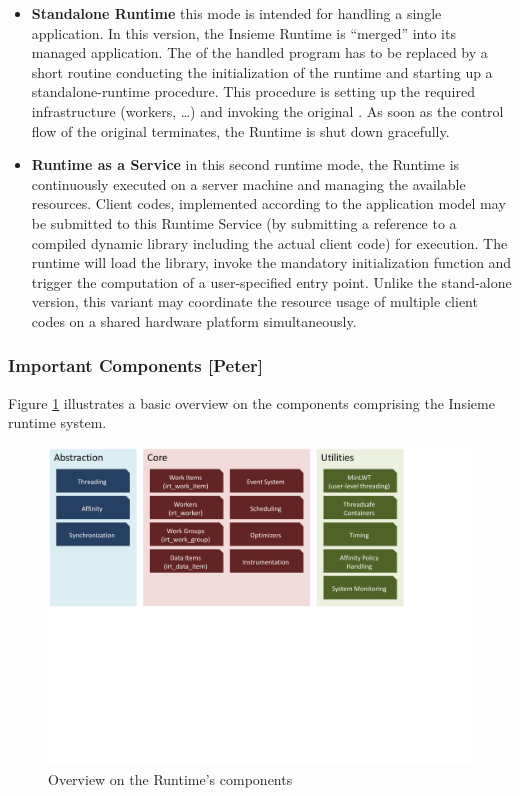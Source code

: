\begin{itemize}
  \item \textbf{Standalone Runtime} this mode is
  intended for handling a single application. In this version, the Insieme
  Runtime is ``merged'' into its managed application. The  of
  the handled program has to be replaced by a short routine conducting the
  initialization of the runtime and starting up a standalone-runtime procedure.
  This procedure is setting up the required infrastructure (workers, \ldots) and
  invoking the original . As soon as the control flow of the
  original  terminates, the Runtime is shut down gracefully.
   
  \item \textbf{Runtime as a Service}
  in this second runtime mode, the Runtime is continuously executed on a server
  machine and managing the available resources. Client codes, implemented
  according to the application model may be submitted to this Runtime Service
  (by submitting a reference to a compiled dynamic library including the actual
  client code) for execution. The runtime will load the library, invoke the
  mandatory initialization function and trigger the computation of a
  user-specified entry point. Unlike the stand-alone version, this variant may
  coordinate the resource usage of multiple client codes on a shared hardware
  platform simultaneously.
\end{itemize} 

\subsubsection{Important Components [Peter]}
Figure \ref{fig:Overview.Runtime.Components} illustrates a basic overview on
the components comprising the Insieme runtime system. 
\begin{figure}[tb]
	\centering
	\includegraphics[width=\textwidth, trim=0 9cm 4cm 0,
	clip]{pics/runtime/overview_components.pdf}
	\caption{Overview on the Runtime's components}
	\label{fig:Overview.Runtime.Components}
\end{figure}


